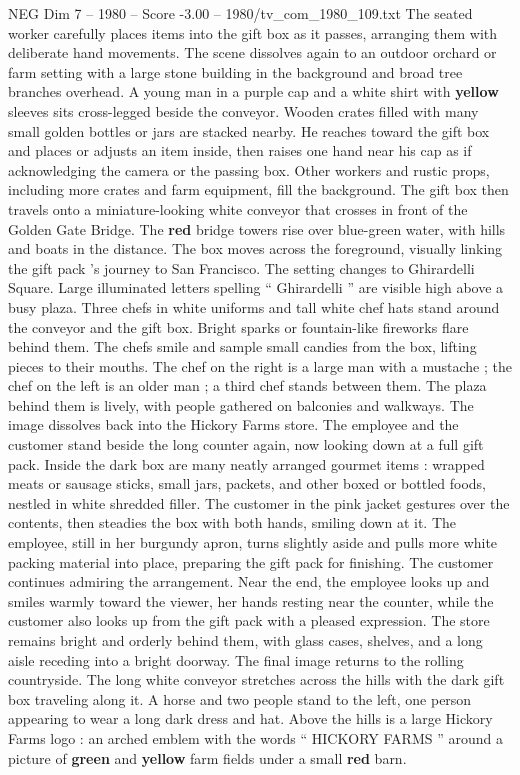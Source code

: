 \begin{textsample}{NEG Dim 7 – 1980 – Score -3.00 – 1980/tv\_com\_1980\_109.txt}
The seated worker carefully places items into the gift box as it passes, arranging them with deliberate hand movements.
The scene dissolves again to an outdoor orchard or farm setting with a large stone building in the background and broad tree branches overhead.
A young man in a purple cap and a white shirt with \textbf{yellow} sleeves sits cross-legged beside the conveyor.
Wooden crates filled with many small golden bottles or jars are stacked nearby.
He reaches toward the gift box and places or adjusts an item inside, then raises one hand near his cap as if acknowledging the camera or the passing box.
Other workers and rustic props, including more crates and farm equipment, fill the background.
The gift box then travels onto a miniature-looking white conveyor that crosses in front of the Golden Gate Bridge.
The \textbf{red} bridge towers rise over blue-green water, with hills and boats in the distance.
The box moves across the foreground, visually linking the gift pack ’s journey to San Francisco.
The setting changes to Ghirardelli Square.
Large illuminated letters spelling “ Ghirardelli ” are visible high above a busy plaza.
Three chefs in white uniforms and tall white chef hats stand around the conveyor and the gift box.
Bright sparks or fountain-like fireworks flare behind them.
The chefs smile and sample small candies from the box, lifting pieces to their mouths.
The chef on the right is a large man with a mustache ; the chef on the left is an older man ; a third chef stands between them.
The plaza behind them is lively, with people gathered on balconies and walkways.
The image dissolves back into the Hickory Farms store.
The employee and the customer stand beside the long counter again, now looking down at a full gift pack.
Inside the dark box are many neatly arranged gourmet items : wrapped meats or sausage sticks, small jars, packets, and other boxed or bottled foods, nestled in white shredded filler.
The customer in the pink jacket gestures over the contents, then steadies the box with both hands, smiling down at it.
The employee, still in her burgundy apron, turns slightly aside and pulls more white packing material into place, preparing the gift pack for finishing.
The customer continues admiring the arrangement.
Near the end, the employee looks up and smiles warmly toward the viewer, her hands resting near the counter, while the customer also looks up from the gift pack with a pleased expression.
The store remains bright and orderly behind them, with glass cases, shelves, and a long aisle receding into a bright doorway.
The final image returns to the rolling countryside.
The long white conveyor stretches across the hills with the dark gift box traveling along it.
A horse and two people stand to the left, one person appearing to wear a long dark dress and hat.
Above the hills is a large Hickory Farms logo : an arched emblem with the words “ HICKORY FARMS ” around a picture of \textbf{green} and \textbf{yellow} farm fields under a small \textbf{red} barn.

\end{textsample}
